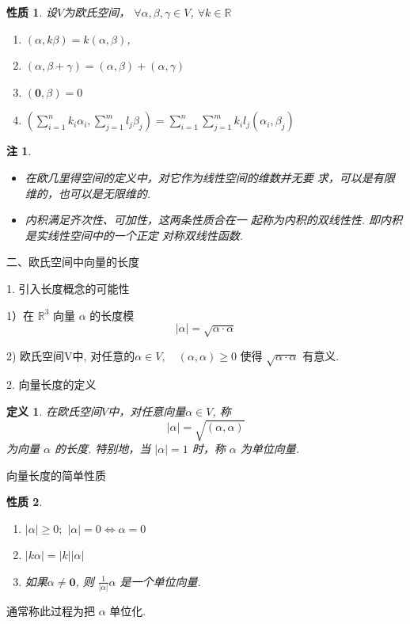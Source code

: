 \documentclass[13pt]{beamer}
\newtheorem*{defi}{定义}
\newtheorem*{rem}{注}
\newtheorem*{prop}{性质}
\def\R{\mathbb{R}}
\def\0{\mathbf{0}}
\begin{document}
\begin{frame}
\begin{prop}
设$V$为欧氏空间， 
$\forall \alpha, \beta, \gamma \in {V}$, $\forall k \in \mathbb{R}$
\begin{enumerate}
	\item  $(\alpha, k \beta)=k(\alpha, \beta)$, 
	\item $(\alpha, \beta+\gamma)=(\alpha, \beta)+(\alpha, \gamma)$
	\item   $({\0}, \beta)=0$
	\item $\left(\sum_{i=1}^{n} k_{i} \alpha_{i}, \sum_{j=1}^{m} l_{j} \beta_{j}\right)=\sum_{i=1}^{n} \sum_{j=1}^{m} k_{i} l_{j}\left(\alpha_{i}, \beta_{j}\right)$
\end{enumerate}
\end{prop}


\begin{rem}
\begin{itemize}
\item 在欧几里得空间的定义中，对它作为线性空间的维数并无要 求，可以是有限维的，也可以是无限维的. 
\item 内积满足齐次性、可加性，这两条性质合在一
起称为内积的双线性性. 即内积是实线性空间中的一个正定
对称双线性函数. 
\end{itemize}
\end{rem}
\end{frame}
 
 
 \begin{frame}{ 二、欧氏空间中向量的长度}
 
 1. 引入长度概念的可能性
 
 1）在 ${\R}^{3}$ 向量 $\alpha$ 的长度模 $$|\alpha|=\sqrt{\alpha \cdot \alpha}$$
 
 2) 欧氏空间V中,  对任意的$ \alpha \in V, \quad(\alpha, \alpha) \geq {0}$ 使得 $\sqrt{\alpha \cdot \alpha}$ 有意义.
 
 2. 向量长度的定义

\begin{defi}
 在欧氏空间$V$中，对任意向量$\alpha \in V$,
称 $$|\alpha|=\sqrt{(\alpha, \alpha)}$$ 为向量 $\alpha$ 的\alert{长度}.
特别地，当 $|\alpha |=1$ 时，称 $\alpha$ 为\alert{单位向量}.
\end{defi}

 \end{frame}


\begin{frame}{向量长度的简单性质}
\begin{prop}
\begin{enumerate}
	\item $|\alpha| \geq {0}; $  \qquad $|\alpha|={0} \Leftrightarrow \alpha={0}$
	
	\item  $|k \alpha|=|k||\alpha|$
	
	\item 如果$\alpha \neq \0$,  则 $\frac{1}{|\alpha|} \alpha$ 是一个\alert{单位向量}. 
\end{enumerate}
\end{prop}



通常称此过程为把 $\alpha$ \alert{单位化}.
\end{frame}
\end{document}
